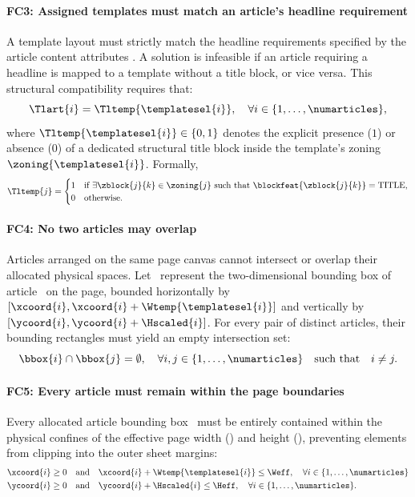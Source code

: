 \paragraph{FC3: Assigned templates must match an article's headline requirement}
A template layout must strictly match the headline requirements specified by the article content attributes . A solution is infeasible if an article requiring a headline is mapped to a template without a title block, or vice versa. This structural compatibility requires that:
\begin{equation}
\Tlart{i} = \Tltemp{\templatesel{i}}, \quad \forall i \in \{1, \dots, \numarticles\},
\end{equation}
where $\Tltemp{\templatesel{i}} \in \{0, 1\}$ denotes the explicit presence ($1$) or absence ($0$) of a dedicated structural title block inside the template's zoning $\zoning{\templatesel{i}}$. Formally, 
\begin{equation}
    \Tltemp{j} = 
    \begin{cases} 
        1 & \text{if } \exists \zblock{j}{k} \in \zoning{j} \text{ such that } \blockfeat{\zblock{j}{k}} = \text{TITLE}, \\ 
        0 & \text{otherwise.} 
    \end{cases}
\end{equation}

\paragraph{FC4: No two articles may overlap}
Articles arranged on the same page canvas cannot intersect or overlap their allocated physical spaces. Let \ represent the two-dimensional bounding box of article \ on the page, bounded horizontally by $[\xcoord{i}, \xcoord{i} + \Wtemp{\templatesel{i}}]$ and vertically by $[\ycoord{i}, \ycoord{i} + \Hscaled{i}]$. For every pair of distinct articles, their bounding rectangles must yield an empty intersection set:
\begin{equation}
\bbox{i} \cap \bbox{j} = \emptyset, \quad \forall i, j \in \{1, \dots, \numarticles\} \quad \text{such that} \quad i \neq j.
\end{equation}

\paragraph{FC5: Every article must remain within the page boundaries}
Every allocated article bounding box \ must be entirely contained within the physical confines of the effective page width (\Weff) and height (\Heff), preventing elements from clipping into the outer sheet margins:
\begin{align}
\xcoord{i} \ge 0 \quad &\text{and} \quad \xcoord{i} + \Wtemp{\templatesel{i}} \le \Weff, \quad \forall i \in \{1, \dots, \numarticles\} \\
\ycoord{i} \ge 0 \quad &\text{and} \quad \ycoord{i} + \Hscaled{i} \le \Heff, \quad \forall i \in \{1, \dots, \numarticles\}.
\end{align}


